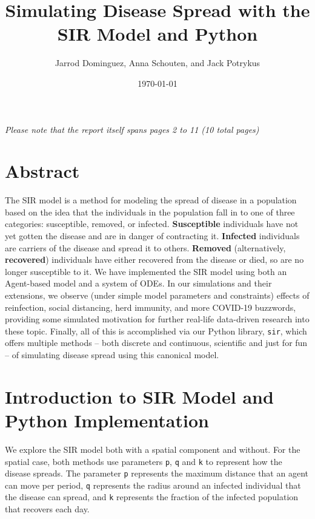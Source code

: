 \documentclass[twoside]{extarticle}                                    %
\title{Simulating Disease Spread with the SIR Model and Python}        %
\author{Jarrod Dominguez, Anna Schouten, and Jack Potrykus}            %
\date{\today}                                                          %
\numberwithin{equation}{section}                                       %
\begin{document}
\maketitle{}           %
\thispagestyle{empty}  %
\tableofcontents{}     %
\vfill{                %
    \begin{center}
        {\small\emph{Please note that the report itself spans pages 2 to 11 (10 total pages)}}
    \end{center}
}


\newpage{}                                                             %
\section{Abstract}
The SIR model is a method for modeling the spread of disease in a population based on the idea that the individuals in the population fall in to one of three categories: susceptible, removed, or infected.
\textbf{Susceptible} individuals have not yet gotten the disease and are in danger of contracting it.
\textbf{Infected} individuals are carriers of the disease and spread it to others.
\textbf{Removed} (alternatively, \textbf{recovered}) individuals have either recovered from the disease or died, so are no longer susceptible to it. We have implemented the SIR model using both an Agent-based model and a system of ODEs.
In our simulations and their extensions, we observe (under simple model parameters and constraints) effects of reinfection, social distancing, herd immunity, and more COVID-19 buzzwords, providing some simulated motivation for further real-life data-driven research into these topic.
Finally, all of this is accomplished via our Python library, \texttt{sir}, which offers multiple methods -- both discrete and continuous, scientific and just for fun -- of simulating disease spread using this canonical model.


\section{Introduction to SIR Model and Python Implementation}
We explore the SIR model both with a spatial component and without. For the spatial case, both methods use parameters \texttt{p}, \texttt{q} and \texttt{k} to represent how the disease spreads. The parameter \texttt{p} represents the maximum distance that an agent can move per period, \texttt{q} represents the radius around an infected individual that the disease can spread, and \texttt{k} represents the fraction of the infected population that recovers each day.
\end{document}
